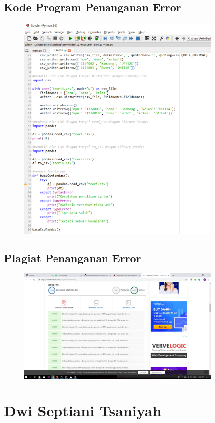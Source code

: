 \subsection{Kode Program Penanganan Error}
\begin{figure}[H]
	\includegraphics[width=10cm]{figures/4/1174026/Praktek/p1.png}
	\centering
\end{figure}

\subsection{Plagiat Penanganan Error}
\begin{figure}[H]
	\includegraphics[width=10cm]{figures/4/1174026/Praktek/plagiatpenanganan.png}
	\centering
\end{figure}


\section{Dwi Septiani Tsaniyah}
